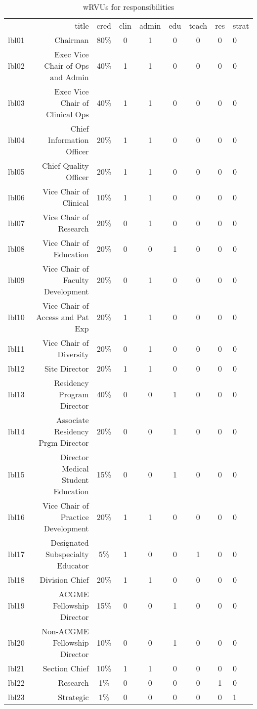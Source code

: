 \begin{table}[H]
\caption{wRVUs for responsibilities}
\label{tab:sample_table}
\begin{tabular}{|r|r|c|c|c|c|c|c|}
 & title & cred & clin & admin & edu & teach & res & strat \\
lbl01 & Chairman & 80\% & 0 & 1 & 0 & 0 & 0 & 0 \\
lbl02 & Exec Vice Chair of Ops and Admin & 40\% & 1 & 1 & 0 & 0 & 0 & 0 \\
lbl03 & Exec Vice Chair of Clinical Ops & 40\% & 1 & 1 & 0 & 0 & 0 & 0 \\
lbl04 & Chief Information Officer & 20\% & 1 & 1 & 0 & 0 & 0 & 0 \\
lbl05 & Chief Quality Officer & 20\% & 1 & 1 & 0 & 0 & 0 & 0 \\
lbl06 & Vice Chair of Clinical & 10\% & 1 & 1 & 0 & 0 & 0 & 0 \\
lbl07 & Vice Chair of Research & 20\% & 0 & 1 & 0 & 0 & 0 & 0 \\
lbl08 & Vice Chair of Education & 20\% & 0 & 0 & 1 & 0 & 0 & 0 \\
lbl09 & Vice Chair of Faculty Development & 20\% & 0 & 1 & 0 & 0 & 0 & 0 \\
lbl10 & Vice Chair of Access and Pat Exp & 20\% & 1 & 1 & 0 & 0 & 0 & 0 \\
lbl11 & Vice Chair of Diversity & 20\% & 0 & 1 & 0 & 0 & 0 & 0 \\
lbl12 & Site Director & 20\% & 1 & 1 & 0 & 0 & 0 & 0 \\
lbl13 & Residency Program Director & 40\% & 0 & 0 & 1 & 0 & 0 & 0 \\
lbl14 & Associate Residency Prgm Director & 20\% & 0 & 0 & 1 & 0 & 0 & 0 \\
lbl15 & Director Medical Student Education & 15\% & 0 & 0 & 1 & 0 & 0 & 0 \\
lbl16 & Vice Chair of  Practice Development & 20\% & 1 & 1 & 0 & 0 & 0 & 0 \\
lbl17 & Designated Subspecialty Educator & 5\% & 1 & 0 & 0 & 1 & 0 & 0 \\
lbl18 & Division Chief & 20\% & 1 & 1 & 0 & 0 & 0 & 0 \\
lbl19 & ACGME Fellowship Director & 15\% & 0 & 0 & 1 & 0 & 0 & 0 \\
lbl20 & Non-ACGME Fellowship Director & 10\% & 0 & 0 & 1 & 0 & 0 & 0 \\
lbl21 & Section Chief & 10\% & 1 & 1 & 0 & 0 & 0 & 0 \\
lbl22 & Research & 1\% & 0 & 0 & 0 & 0 & 1 & 0 \\
lbl23 & Strategic & 1\% & 0 & 0 & 0 & 0 & 0 & 1 \\
\end{tabular}
\end{table}

